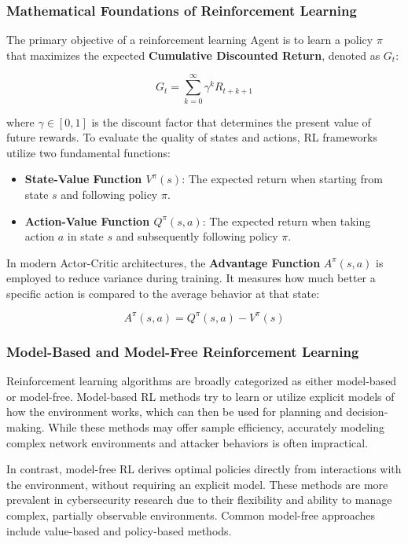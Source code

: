 \documentclass[12pt,a4paper]{report}
\begin{document}
\subsubsection*{Mathematical Foundations of Reinforcement Learning}

The primary objective of a reinforcement learning Agent is to learn a policy $\pi$ that maximizes the expected \textbf{Cumulative Discounted Return}, denoted as $G_t$:

\begin{equation}
G_t = \sum_{k=0}^{\infty} \gamma^k R_{t+k+1}
\end{equation}

where $\gamma \in [0, 1]$ is the discount factor that determines the present value of future rewards. To evaluate the quality of states and actions, RL frameworks utilize two fundamental functions:
\begin{itemize}
    \item \textbf{State-Value Function $V^\pi(s)$}: The expected return when starting from state $s$ and following policy $\pi$.
    \item \textbf{Action-Value Function $Q^\pi(s,a)$}: The expected return when taking action $a$ in state $s$ and subsequently following policy $\pi$.
\end{itemize}

In modern Actor-Critic architectures, the \textbf{Advantage Function} $A^\pi(s,a)$ is employed to reduce variance during training. It measures how much better a specific action is compared to the average behavior at that state:

\begin{equation}
A^\pi(s,a) = Q^\pi(s,a) - V^\pi(s)
\end{equation}

\subsubsection*{Model-Based and Model-Free Reinforcement Learning}

Reinforcement learning algorithms are broadly categorized as either model-based or model-free. Model-based RL methods try to learn or utilize explicit models of how the environment works, which can then be used for planning and decision-making. While these methods may offer sample efficiency, accurately modeling complex network environments and attacker behaviors is often impractical.

In contrast, model-free RL derives optimal policies directly from interactions with the environment, without requiring an explicit model. These methods are more prevalent in cybersecurity research due to their flexibility and ability to manage complex, partially observable environments. Common model-free approaches include value-based and policy-based methods.
\end{document}

